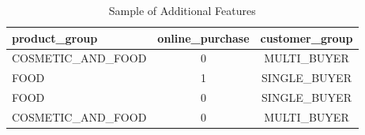 \begin{table}[htb]
	\centering
	\caption{Sample of Additional Features}
	\label{tab:sample_add_feat}
	\begin{tabular*}{\linewidth}{lcc}
		\toprule
		\tiny \textbf{product\_group} & \tiny \textbf{online\_purchase} & \tiny \textbf{customer\_group} \\
		\midrule
\scriptsize COSMETIC\_AND\_FOOD & \scriptsize 0 & \scriptsize MULTI\_BUYER \\
\scriptsize FOOD & \scriptsize 1 & \scriptsize SINGLE\_BUYER \\
\scriptsize FOOD & \scriptsize 0 & \scriptsize SINGLE\_BUYER \\
\scriptsize COSMETIC\_AND\_FOOD & \scriptsize 0 & \scriptsize MULTI\_BUYER \\
		\bottomrule
	\end{tabular*}
\end{table}
